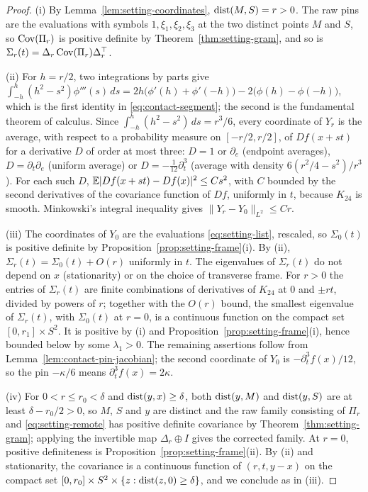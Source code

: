 \begin{proof}
(i) By Lemma~\ref{lem:setting-coordinates}, $\operatorname{dist}(M,S)=r>0$. The raw pins are the evaluations with symbols $1,\xi_1,\xi_2,\xi_3$ at the two distinct points $M$ and $S$, so $\operatorname{Cov}(\Pi_r)$ is positive definite by Theorem~\ref{thm:setting-gram}, and so is $\Sigma_r(t)=\Delta_r\operatorname{Cov}(\Pi_r)\Delta_r^{\top}$.

(ii) For $h=r/2$, two integrations by parts give $\int_{-h}^{h}(h^2-s^2)\phi'''(s)\,ds=2h\bigl(\phi'(h)+\phi'(-h)\bigr)-2\bigl(\phi(h)-\phi(-h)\bigr)$, which is the first identity in \eqref{eq:contact-segment}; the second is the fundamental theorem of calculus. Since $\int_{-h}^{h}(h^2-s^2)\,ds=r^3/6$, every coordinate of $Y_r$ is the average, with respect to a probability measure on $[-r/2,r/2]$, of $Df(x+st)$ for a derivative $D$ of order at most three: $D=1$ or $\partial_e$ (endpoint averages), $D=\partial_t\partial_e$ (uniform average) or $D=-\frac1{12}\partial_t^3$ (average with density $6(r^2/4-s^2)/r^3$). For each such $D$, $\mathbb E|Df(x+st)-Df(x)|^2\le Cs^2$, with $C$ bounded by the second derivatives of the covariance function of $Df$, uniformly in $t$, because $K_{24}$ is smooth. Minkowski's integral inequality gives $\|Y_r-Y_0\|_{L^2}\le Cr$.

(iii) The coordinates of $Y_0$ are the evaluations \eqref{eq:setting-list}, rescaled, so $\Sigma_0(t)$ is positive definite by Proposition~\ref{prop:setting-frame}(i). By (ii), $\Sigma_r(t)=\Sigma_0(t)+O(r)$ uniformly in $t$. The eigenvalues of $\Sigma_r(t)$ do not depend on $x$ (stationarity) or on the choice of transverse frame. For $r>0$ the entries of $\Sigma_r(t)$ are finite combinations of derivatives of $K_{24}$ at $0$ and $\pm rt$, divided by powers of $r$; together with the $O(r)$ bound, the smallest eigenvalue of $\Sigma_r(t)$, with $\Sigma_0(t)$ at $r=0$, is a continuous function on the compact set $[0,r_1]\times S^2$. It is positive by (i) and Proposition~\ref{prop:setting-frame}(i), hence bounded below by some $\lambda_1>0$. The remaining assertions follow from Lemma~\ref{lem:contact-pin-jacobian}; the second coordinate of $Y_0$ is $-\partial_t^3f(x)/12$, so the pin $-\kappa/6$ means $\partial_t^3f(x)=2\kappa$.

(iv) For $0<r\le r_0<\delta$ and $\operatorname{dist}(y,x)\ge\delta$, both $\operatorname{dist}(y,M)$ and $\operatorname{dist}(y,S)$ are at least $\delta-r_0/2>0$, so $M$, $S$ and $y$ are distinct and the raw family consisting of $\Pi_r$ and \eqref{eq:setting-remote} has positive definite covariance by Theorem~\ref{thm:setting-gram}; applying the invertible map $\Delta_r\oplus I$ gives the corrected family. At $r=0$, positive definiteness is Proposition~\ref{prop:setting-frame}(ii). By (ii) and stationarity, the covariance is a continuous function of $(r,t,y-x)$ on the compact set $[0,r_0]\times S^2\times\{z:\operatorname{dist}(z,0)\ge\delta\}$, and we conclude as in (iii).
\end{proof}

